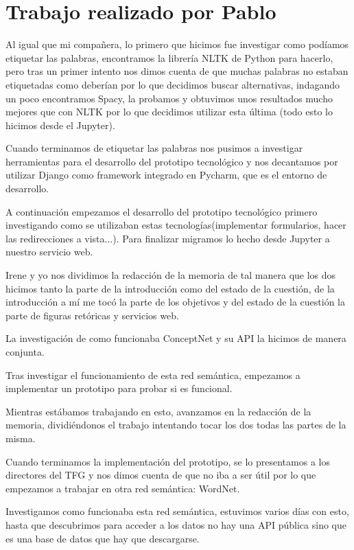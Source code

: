 \section{Trabajo realizado por Pablo}
\label{cap:sec:trabajo_Pablo}

Al igual que mi compañera, lo primero que hicimos fue investigar como podíamos etiquetar las palabras, encontramos la librería NLTK de Python para hacerlo, pero tras un primer intento nos dimos cuenta de que muchas palabras no estaban etiquetadas como deberían por lo que decidimos buscar alternativas, indagando un poco encontramos Spacy, la probamos y obtuvimos unos resultados mucho mejores que con NLTK por lo que decidimos utilizar esta última (todo esto lo hicimos desde el Jupyter). 

Cuando terminamos de etiquetar las palabras nos pusimos a investigar herramientas para el desarrollo del prototipo tecnológico y nos decantamos por utilizar Django como framework integrado en Pycharm, que es el entorno de desarrollo.

A continuación empezamos el desarrollo del prototipo tecnológico primero investigando como se utilizaban estas tecnologías(implementar formularios, hacer las redirecciones a vista...). Para finalizar migramos lo hecho desde Jupyter a nuestro servicio web.

Irene y yo nos dividimos la redacción de la memoria de tal manera que los dos hicimos tanto la parte de la introducción como del estado de la cuestión, de la introducción a mí me tocó la parte de los objetivos y del estado de la cuestión la parte de figuras retóricas y servicios web.

La investigación de como funcionaba ConceptNet y su API la hicimos de manera conjunta.

Tras investigar el funcionamiento de esta red semántica, empezamos a implementar un prototipo para probar si es funcional.

Mientras estábamos trabajando en esto, avanzamos en la redacción de la memoria, dividiéndonos el trabajo intentando tocar los dos todas las partes de la misma.

Cuando terminamos la implementación del prototipo, se lo presentamos a los directores del TFG y nos dimos cuenta de que no iba a ser útil por lo que empezamos a trabajar en otra red semántica: WordNet.

Investigamos como funcionaba esta red semántica, estuvimos varios días con esto, hasta que descubrimos para acceder a los datos no hay una API pública sino que es una base de datos que hay que descargarse.

